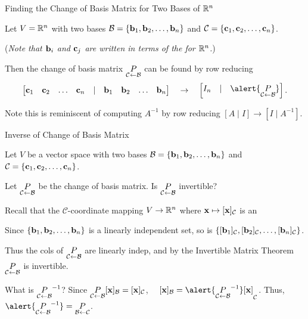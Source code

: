 \documentclass[xcolor=dvipsnames,aspectratio=169,t]{beamer}
\renewcommand{\C}{\mathcal{C}}
\begin{document}
\begin{frame}{Finding the Change of Basis Matrix for Two Bases of $\mathbb{R}^n$}
  \bigskip

  Let $V=\mathbb{R}^n$ with two bases 
  $\mathcal{B} = \left\{ \mathbf{b}_1, \mathbf{b}_2, \ldots, \mathbf{b}_n \right\}$ and
  $\C = \left\{ \c_1, \c_2, \ldots, \c_n \right\}$.
  \smallskip
  
  \quad (\emph{Note that $\mathbf{b}_i$ and $\mathbf{c}_j$ are written in terms of the  for $\mathbb{R}^n$.})
  \bigskip
  
  Then the \alert{change of basis matrix $\underset{\C\leftarrow\B}P$} can be found by row reducing
  \[
    \begin{bmatrix}
      \c_1 & \c_2 & \ldots & \c_n & | & \b_1 & \b_2 & \ldots & \b_n 
    \end{bmatrix}
    \quad \rightarrow \quad 
    \begin{bmatrix}
      I_n & | & \alert{\underset{\C\leftarrow\B}P}
    \end{bmatrix}.
  \]
  \vspace*{2em}
  
  Note this is reminiscent of computing $A^{-1}$ by row reducing $[A \mid I] \rightarrow [ I \mid A^{-1}]$.
  
\end{frame}


\begin{frame}{Inverse of Change of Basis Matrix}
  \medskip
  
  Let $V$ be a vector space with two bases 
  $\mathcal{B} = \left\{ \mathbf{b}_1, \mathbf{b}_2, \ldots, \mathbf{b}_n \right\}$ and
  $\C = \left\{ \c_1, \c_2, \ldots, \c_n \right\}$.
  \smallskip
  
  Let $\underset{\C\leftarrow\B}P$ be the change of basis matrix.
  Is $\underset{\C\leftarrow\B}P$ \alert{invertible}?
  \vspace*{2em}
  
  \pause
  Recall that the $\C$-coordinate mapping $V\to\mathbb{R}^n$ where $\x\mapsto [\x]_\C$ is an 
  \smallskip
  
  Since $\{\mathbf{b}_1, \mathbf{b}_2, \ldots, \mathbf{b}_n\}$ is a linearly independent set,
  so is $\{[\b_1]_\C, [\b_2]_\C, \ldots, [\b_n]_\C\}$.
  \smallskip
  
  Thus the cols of $\underset{\C\leftarrow\B}P$ are linearly indep,
  and by the Invertible Matrix Theorem $\underset{\C\leftarrow\B}P$ is invertible.%
  \vspace*{2.5em}
  
  \pause
  What is \alert{$\underset{\C\leftarrow\B}P^{-1}$}?
  \pause
  Since $\underset{\C\leftarrow\B}P [\x]_\B= [\x]_\C$, \ \ 
  $[\x]_\B = \alert{\underset{\C\leftarrow\B}P^{-1}} [\x]_\C$.
  Thus, $\alert{\underset{\C\leftarrow\B}P^{-1}} = \underset{\B\leftarrow\C}P$.
\end{frame}
\end{document}
